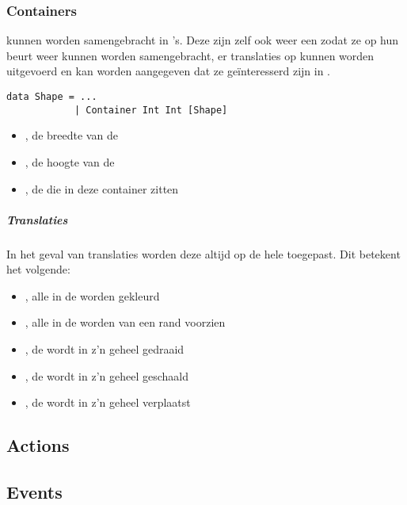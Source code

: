 \subsubsection{Containers}
\shapes kunnen worden samengebracht in 's. Deze zijn zelf ook weer een \shape zodat ze op hun beurt weer kunnen worden samengebracht, er translaties op kunnen worden uitgevoerd en kan worden aangegeven dat ze geïnteresserd zijn in \events. 
\begin{lstlisting}
data Shape = ...
			| Container Int Int [Shape]
\end{lstlisting}
\begin{itemize}
	\item {}, de breedte van de 
	\item {}, de hoogte van de 
	\item \type{[Shape]}, de \shapes die in deze container zitten
\end{itemize}

\subparagraph{Translaties}
In het geval van translaties worden deze altijd op de hele  toegepast. Dit betekent het volgende:
\begin{itemize}
	\item {}, alle \shapes in de  worden gekleurd
	\item {}, alle \shapes in de  worden van een rand voorzien
	\item {}, de  wordt in z'n geheel gedraaid
	\item {}, de  wordt in z'n geheel geschaald
	\item {}, de  wordt in z'n geheel verplaatst
\end{itemize}

\subsection{Actions}

\subsection{Events}
